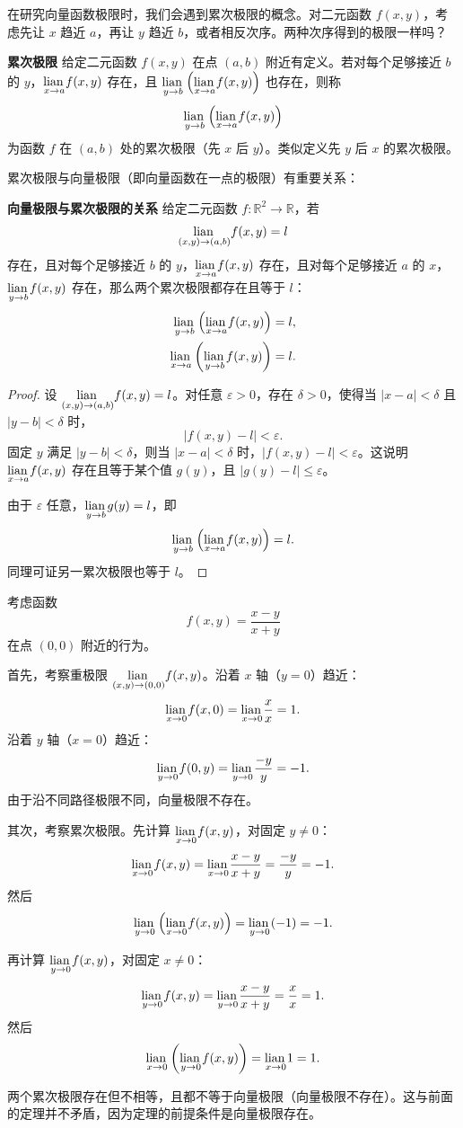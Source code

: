 \documentclass[12pt,UTF8]{ctexbook}
\begin{document}
在研究向量函数极限时，我们会遇到累次极限的概念。对二元函数 $f(x, y)$，考虑先让 $x$ 趋近 $a$，再让 $y$ 趋近 $b$，或者相反次序。两种次序得到的极限一样吗？

\begin{df}{\textbf{累次极限}}
给定二元函数 $f(x, y)$ 在点 $(a, b)$ 附近有定义。若对每个足够接近 $b$ 的 $y$，$\underset{x\to a}{\operatorname{lian}\,} f(x, y)$ 存在，且 $\underset{y\to b}{\operatorname{lian}\,} \left(\underset{x\to a}{\operatorname{lian}\,} f(x, y)\right)$ 也存在，则称
$$ \underset{y\to b}{\operatorname{lian}\,} \left(\underset{x\to a}{\operatorname{lian}\,} f(x, y)\right) $$
为函数 $f$ 在 $(a, b)$ 处的累次极限（先 $x$ 后 $y$）。类似定义先 $y$ 后 $x$ 的累次极限。
\end{df}

累次极限与向量极限（即向量函数在一点的极限）有重要关系：

\begin{tm}{\textbf{向量极限与累次极限的关系}}
给定二元函数 $f: \mathbb{R}^2 \rightarrow \mathbb{R}$，若
$$ \underset{(x,y)\to (a,b)}{\operatorname{lian}\,} f(x, y) = l $$
存在，且对每个足够接近 $b$ 的 $y$，$\underset{x\to a}{\operatorname{lian}\,} f(x, y)$ 存在，且对每个足够接近 $a$ 的 $x$，$\underset{y\to b}{\operatorname{lian}\,} f(x, y)$ 存在，那么两个累次极限都存在且等于 $l$：
\begin{align*}
\underset{y\to b}{\operatorname{lian}\,} \left(\underset{x\to a}{\operatorname{lian}\,} f(x, y)\right) &= l, \\
\underset{x\to a}{\operatorname{lian}\,} \left(\underset{y\to b}{\operatorname{lian}\,} f(x, y)\right) &= l.
\end{align*}
\end{tm}

\begin{proof}
设 $\underset{(x,y)\to (a,b)}{\operatorname{lian}\,} f(x, y) = l$。对任意 $\varepsilon > 0$，存在 $\delta > 0$，使得当 $|x-a| < \delta$ 且 $|y-b| < \delta$ 时，
$$ |f(x, y) - l| < \varepsilon. $$
固定 $y$ 满足 $|y-b| < \delta$，则当 $|x-a| < \delta$ 时，$|f(x, y) - l| < \varepsilon$。这说明 $\underset{x\to a}{\operatorname{lian}\,} f(x, y)$ 存在且等于某个值 $g(y)$，且 $|g(y) - l| \leq \varepsilon$。

由于 $\varepsilon$ 任意，$\underset{y\to b}{\operatorname{lian}\,} g(y) = l$，即
$$ \underset{y\to b}{\operatorname{lian}\,} \left(\underset{x\to a}{\operatorname{lian}\,} f(x, y)\right) = l. $$
同理可证另一累次极限也等于 $l$。
\end{proof}

\begin{et}
考虑函数
$$ f(x, y) = \frac{x-y}{x+y} $$
在点 $(0, 0)$ 附近的行为。

首先，考察重极限 $\underset{(x,y)\to (0,0)}{\operatorname{lian}\,} f(x, y)$。沿着 $x$ 轴（$y=0$）趋近：
$$ \underset{x\to 0}{\operatorname{lian}\,} f(x, 0) = \underset{x\to 0}{\operatorname{lian}\,} \frac{x}{x} = 1. $$
沿着 $y$ 轴（$x=0$）趋近：
$$ \underset{y\to 0}{\operatorname{lian}\,} f(0, y) = \underset{y\to 0}{\operatorname{lian}\,} \frac{-y}{y} = -1. $$
由于沿不同路径极限不同，向量极限不存在。

其次，考察累次极限。先计算 $\underset{x\to 0}{\operatorname{lian}\,} f(x, y)$，对固定 $y \neq 0$：
$$ \underset{x\to 0}{\operatorname{lian}\,} f(x, y) = \underset{x\to 0}{\operatorname{lian}\,} \frac{x-y}{x+y} = \frac{-y}{y} = -1. $$
然后
$$ \underset{y\to 0}{\operatorname{lian}\,} \left(\underset{x\to 0}{\operatorname{lian}\,} f(x, y)\right) = \underset{y\to 0}{\operatorname{lian}\,} (-1) = -1. $$

再计算 $\underset{y\to 0}{\operatorname{lian}\,} f(x, y)$，对固定 $x \neq 0$：
$$ \underset{y\to 0}{\operatorname{lian}\,} f(x, y) = \underset{y\to 0}{\operatorname{lian}\,} \frac{x-y}{x+y} = \frac{x}{x} = 1. $$
然后
$$ \underset{x\to 0}{\operatorname{lian}\,} \left(\underset{y\to 0}{\operatorname{lian}\,} f(x, y)\right) = \underset{x\to 0}{\operatorname{lian}\,} 1 = 1. $$

两个累次极限存在但不相等，且都不等于向量极限（向量极限不存在）。这与前面的定理并不矛盾，因为定理的前提条件是向量极限存在。
\end{et}
\end{document}
